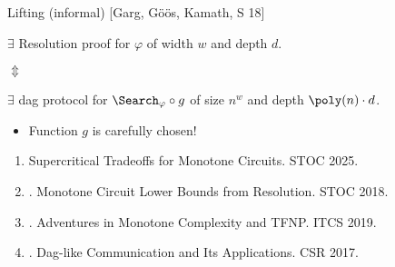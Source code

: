 \begin{frame}{Lifting (informal) [Garg, G\"{o}\"{o}s, Kamath, S 18]}


    \begin{center}
        \alert{$\exists$} Resolution proof for $\varphi$ of width $w$ and depth $d$.

        $\Updownarrow$
        
        \alert{$\exists$} dag protocol for $\Search_{\varphi} \circ g$ of size $n^w$ and depth $\poly(n)
        \cdot d$.
    \end{center}

    \vspace{0.5cm}
    \begin{itemize}
        \item Function $g$ is carefully chosen!
    \end{itemize}
    \vspace{0.5cm}


    \pause
    \begin{enumerate}
        \item[] [G{\"{o}}{\"{o}}s, Maystre, Risse, \textcolor{blue}{S} 24] Supercritical Tradeoffs for
            Monotone Circuits. STOC 2025.
        \item[] [Garg, G\"{o}\"{o}s, Kamath, \textcolor{blue}{S} 18]. Monotone Circuit Lower Bounds from
            Resolution. STOC 2018.
        \item[] [G\"{o}\"{o}s, Kamath, Robere, \textcolor{blue}{S} 19]. Adventures in Monotone Complexity and
            TFNP. ITCS 2019.
        \item[] [\textcolor{blue}{S} 17]. Dag-like Communication and Its Applications. CSR 2017.
    \end{enumerate}


\end{frame}